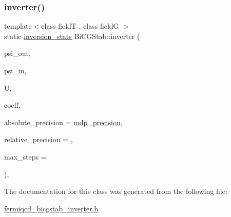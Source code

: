 \subsubsection{\texorpdfstring{inverter()}{inverter()}}
{\footnotesize\ttfamily template$<$class fieldT , class fieldG $>$ \\
static \hyperlink{classinversion__stats}{inversion\+\_\+stats} Bi\+C\+G\+Stab\+::inverter (\begin{DoxyParamCaption}\item[{fieldT \&}]{psi\+\_\+out,  }\item[{fieldT \&}]{psi\+\_\+in,  }\item[{fieldG \&}]{U,  }\item[{\hyperlink{classcoefficients}{coefficients} \&}]{coeff,  }\item[{\hyperlink{mdp__global__vars_8h_a69d96b74c791e0bbdb888b3913a69450}{mdp\+\_\+real}}]{absolute\+\_\+precision = {\ttfamily \hyperlink{mdp__global__vars_8h_a443a4ca745298420893e113a7ac926a9}{mdp\+\_\+precision}},  }\item[{\hyperlink{mdp__global__vars_8h_a69d96b74c791e0bbdb888b3913a69450}{mdp\+\_\+real}}]{relative\+\_\+precision = {},  }\item[{int}]{max\+\_\+steps = {} }\end{DoxyParamCaption})\hspace{0.3cm}{\ttfamily [inline]}, {\ttfamily [static]}}



The documentation for this class was generated from the following file\+:\begin{DoxyCompactItemize}
\item 
\hyperlink{fermiqcd__bicgstab__inverter_8h}{fermiqcd\+\_\+bicgstab\+\_\+inverter.\+h}\end{DoxyCompactItemize}
